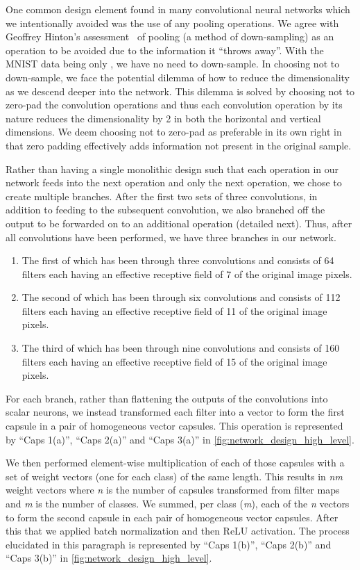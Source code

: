 \documentclass{article}
\newcommand{\rightparenthesis}{)}
\begin{document}
One common design element found in many convolutional neural networks which we intentionally avoided was the use of any pooling operations.  We agree with Geoffrey Hinton's assessment~\cite{Hinton2018b} of pooling (a method of down-sampling) as an operation to be avoided due to the information it ``throws away''.  With the MNIST data being only , we have no need to down-sample.  In choosing not to down-sample, we face the potential dilemma of how to reduce the dimensionality as we descend deeper into the network.  This dilemma is solved by choosing not to zero-pad the convolution operations and thus each convolution operation by its nature reduces the dimensionality by 2 in both the horizontal and vertical dimensions.  We deem choosing not to zero-pad as preferable in its own right in that zero padding effectively adds information not present in the original sample.

Rather than having a single monolithic design such that each operation in our network feeds into the next operation and only the next operation, we chose to create multiple branches.  After the first two sets of three convolutions, in addition to feeding to the subsequent convolution, we also branched off the output to be forwarded on to an additional operation (detailed next).  Thus, after all convolutions have been performed, we have three branches in our network.
\begin{enumerate}[label=\arabic*\rightparenthesis]
\item The first of which has been through three  convolutions and consists of 64 filters each having an effective receptive field of 7 of the original image pixels.
\item The second of which has been through six  convolutions and consists of 112 filters each having an effective receptive field of 11 of the original image pixels.
\item The third of which has been through nine  convolutions and consists of 160 filters each having an effective receptive field of 15 of the original image pixels.
\end{enumerate}

For each branch, rather than flattening the outputs of the convolutions into scalar neurons, we instead transformed each filter into a vector to form the first capsule in a pair of homogeneous vector capsules.  This operation is represented by ``Caps 1(a)'', ``Caps 2(a)'' and ``Caps 3(a)'' in \autoref{fig:network_design_high_level}.

We then performed element-wise multiplication of each of those capsules with a set of weight vectors (one for each class) of the same length.  This results in \textit{n}\textit{m} weight vectors where \textit{n} is the number of capsules transformed from filter maps and \textit{m} is the number of classes.  We summed, per class (\textit{m}), each of the \textit{n} vectors to form the second capsule in each pair of homogeneous vector capsules.  After this that we applied batch normalization and then ReLU activation.  The process elucidated in this paragraph is represented by ``Caps 1(b)'', ``Caps 2(b)'' and ``Caps 3(b)'' in \autoref{fig:network_design_high_level}.
\end{document}
